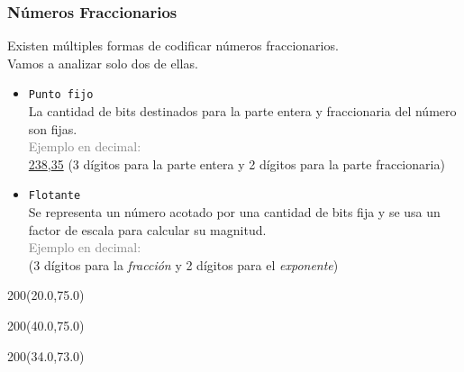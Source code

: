 \documentclass[aspectratio=169]{beamer}
\begin{document}

\begin{frame}[fragile,t]
    \frametitle{Números Fraccionarios}
    Existen múltiples formas de codificar números fraccionarios.\\
    Vamos a analizar solo dos de ellas.\\
    \vspace{0.5cm}
    \pause
    \begin{itemize}
    \item \textcolor{naranjauca}{\texttt{Punto fijo}}\\
    La cantidad de bits destinados para la parte entera y fraccionaria del número son fijas.\\
    { \footnotesize \textcolor{gray}{Ejemplo en decimal:} \\
    \hspace{1cm} \ul{2}\hspace{0.05cm}\ul{3}\hspace{0.05cm}\ul{8}\hspace{0.05cm},\hspace{0.05cm}\ul{3}\hspace{0.05cm}\ul{5}
    \hspace{0.2cm} \textcolor{verdeuca}{(3 dígitos para la parte entera y 2 dígitos para la parte fraccionaria) } }
    \vspace{0.5cm}
    \pause
    \item \textcolor{naranjauca}{\texttt{Flotante}}\\
    Se representa un número acotado por una cantidad de bits fija y se usa un factor de escala para calcular su magnitud.\\
    { \footnotesize \textcolor{gray}{Ejemplo en decimal:} \\
    \vspace{0.3cm} \hspace{5cm} \textcolor{verdeuca}{(3 dígitos para la \textit{fracción} y 2 dígitos para el \textit{exponente}) } }
    \end{itemize}
    \begin{textblock}{200}(20.0,75.0) {  } \end{textblock}
    \begin{textblock}{200}(40.0,75.0) {  } \end{textblock}
    \begin{textblock}{200}(34.0,73.0) {  } \end{textblock}
\end{frame}
\end{document}

